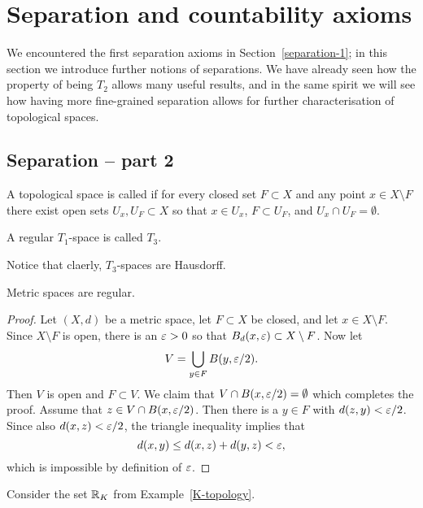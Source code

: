 \section{Separation and countability axioms}
\label{separation}
We encountered the first separation axioms in Section~\ref{separation-1}; in this section we introduce further notions of separations. We have already seen how the property of being $T_2$ allows many useful results, and in the same spirit we will see how having more fine-grained separation allows for further characterisation of topological spaces.
\subsection{Separation -- part 2}
\begin{defn}
  A topological space is called  if for every closed set $F \subset X$ and any point $x \in X \setminus F$ there exist open sets $U_x, U_F \subset X$ so that $x \in U_x$, $F \subset U_F$, and $U_x \cap U_F = \emptyset$.
  
  A regular $T_1$-space is called $T_3$.
\end{defn}
Notice that claerly, $T_3$-spaces are Hausdorff.
\begin{prop}
  Metric spaces are regular.
\end{prop}
\begin{proof}
  Let $(X,d)$ be a metric space, let $F \subset X$ be closed, and let $x \in X \setminus F$. Since $X \setminus F$ is open, there is an $\varepsilon > 0$ so that $B_d(x,\varepsilon) \subset X \setminus F$. Now let
  \[
    V = \bigcup_{y \in F} B(y,\varepsilon/2).
  \]
  Then $V$ is open and $F \subset V$. We claim that $V \cap B(x,\varepsilon/2) = \emptyset$ which completes the proof. Assume that $z \in V \cap B(x,\varepsilon/2)$. Then there is a $y \in F$ with $d(z,y) < \varepsilon/2$. Since also $d(x,z) < \varepsilon/2$, the triangle inequality implies that
  \[
    d(x,y) \leq d(x,z) + d(y,z) < \varepsilon,
  \]
  which is impossible by definition of $\varepsilon$.
\end{proof}
\begin{example}
  Consider the set $\mathbb{R}_K$ from Example~\ref{K-topology}.
\end{example}
